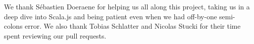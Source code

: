 We thank S\'{e}bastien Doeraene for helping us all along this project,
taking us in a deep dive into Scala.js and being patient even when we had
off-by-one semi-colons error. We also thank Tobias Schlatter and Nicolas Stucki
for their time spent reviewing our pull requests.